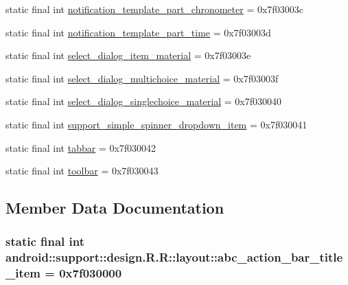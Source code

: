 \begin{CompactItemize}
static final int \hyperlink{classandroid_1_1support_1_1design_1_1_r_1_1layout_408bbe386a55933b12db17bd003dea29}{notification\_\-template\_\-part\_\-chronometer} = 0x7f03003c
\item 
static final int \hyperlink{classandroid_1_1support_1_1design_1_1_r_1_1layout_5029e377124c3bbcf9dcff0be071c5d6}{notification\_\-template\_\-part\_\-time} = 0x7f03003d
\item 
static final int \hyperlink{classandroid_1_1support_1_1design_1_1_r_1_1layout_70c504a0317c255017559cf66a027a9d}{select\_\-dialog\_\-item\_\-material} = 0x7f03003e
\item 
static final int \hyperlink{classandroid_1_1support_1_1design_1_1_r_1_1layout_9fb1823d3041c14558df5bf4236f73c0}{select\_\-dialog\_\-multichoice\_\-material} = 0x7f03003f
\item 
static final int \hyperlink{classandroid_1_1support_1_1design_1_1_r_1_1layout_02d5efacc446d7e99fe14356338141ff}{select\_\-dialog\_\-singlechoice\_\-material} = 0x7f030040
\item 
static final int \hyperlink{classandroid_1_1support_1_1design_1_1_r_1_1layout_dfd4d6717c3a2c6dc8d658c36da39d85}{support\_\-simple\_\-spinner\_\-dropdown\_\-item} = 0x7f030041
\item 
static final int \hyperlink{classandroid_1_1support_1_1design_1_1_r_1_1layout_cf8fbe368ae34fc2e729901ff5ddfa10}{tabbar} = 0x7f030042
\item 
static final int \hyperlink{classandroid_1_1support_1_1design_1_1_r_1_1layout_28cc001023dd0777d11fbf9ccd15f830}{toolbar} = 0x7f030043
\end{CompactItemize}


\subsection{Member Data Documentation}
\hypertarget{classandroid_1_1support_1_1design_1_1_r_1_1layout_7de5fb7982f76f0c745d56080e36242d}{
\subsubsection[{abc\_\-action\_\-bar\_\-title\_\-item}]{\setlength{\rightskip}{0pt plus 5cm}static final int android::support::design.R.R::layout::abc\_\-action\_\-bar\_\-title\_\-item = 0x7f030000}}
\label{classandroid_1_1support_1_1design_1_1_r_1_1layout_7de5fb7982f76f0c745d56080e36242d}


